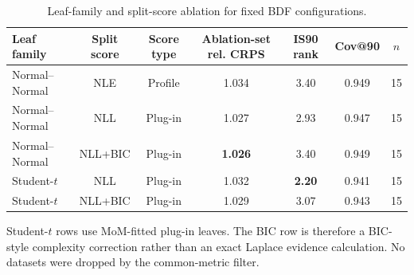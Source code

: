\begin{table}[htbp]
\centering
\caption{Leaf-family and split-score ablation for fixed BDF configurations.}
\label{tab:bdf-leaf-score-ablation}
\begin{tabular}{lcccccc}
\toprule
Leaf family & Split score & Score type & Ablation-set rel. CRPS & IS90 rank & Cov@90 & $n$ \\
\midrule
Normal--Normal & NLE & Profile & 1.034 & 3.40 & 0.949 & 15 \\
Normal--Normal & NLL & Plug-in & 1.027 & 2.93 & 0.947 & 15 \\
Normal--Normal & NLL+BIC & Plug-in & \textbf{1.026} & 3.40 & 0.949 & 15 \\
Student-$t$ & NLL & Plug-in & 1.032 & \textbf{2.20} & 0.941 & 15 \\
Student-$t$ & NLL+BIC & Plug-in & 1.029 & 3.07 & 0.943 & 15 \\
\bottomrule
\end{tabular}
\par\smallskip\footnotesize{Student-$t$ rows use MoM-fitted plug-in leaves. The BIC row is therefore a BIC-style complexity correction rather than an exact Laplace evidence calculation. No datasets were dropped by the common-metric filter.}
\end{table}
